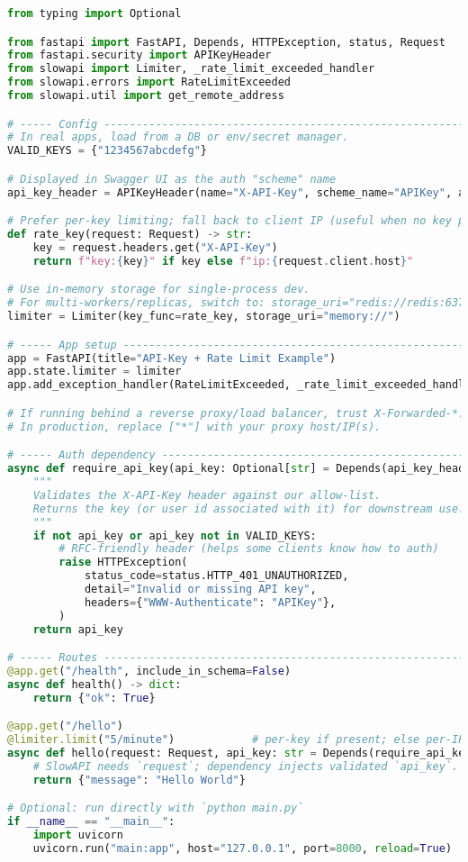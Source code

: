 \begin{lstlisting}[language=Python]
from typing import Optional

from fastapi import FastAPI, Depends, HTTPException, status, Request
from fastapi.security import APIKeyHeader
from slowapi import Limiter, _rate_limit_exceeded_handler
from slowapi.errors import RateLimitExceeded
from slowapi.util import get_remote_address

# ----- Config ---------------------------------------------------------------
# In real apps, load from a DB or env/secret manager.
VALID_KEYS = {"1234567abcdefg"}

# Displayed in Swagger UI as the auth "scheme" name
api_key_header = APIKeyHeader(name="X-API-Key", scheme_name="APIKey", auto_error=False)

# Prefer per-key limiting; fall back to client IP (useful when no key provided)
def rate_key(request: Request) -> str:
    key = request.headers.get("X-API-Key")
    return f"key:{key}" if key else f"ip:{request.client.host}"

# Use in-memory storage for single-process dev.
# For multi-workers/replicas, switch to: storage_uri="redis://redis:6379/0"
limiter = Limiter(key_func=rate_key, storage_uri="memory://")

# ----- App setup ------------------------------------------------------------
app = FastAPI(title="API-Key + Rate Limit Example")
app.state.limiter = limiter
app.add_exception_handler(RateLimitExceeded, _rate_limit_exceeded_handler)

# If running behind a reverse proxy/load balancer, trust X-Forwarded-*.
# In production, replace ["*"] with your proxy host/IP(s).

# ----- Auth dependency ------------------------------------------------------
async def require_api_key(api_key: Optional[str] = Depends(api_key_header)) -> str:
    """
    Validates the X-API-Key header against our allow-list.
    Returns the key (or user id associated with it) for downstream use.
    """
    if not api_key or api_key not in VALID_KEYS:
        # RFC-friendly header (helps some clients know how to auth)
        raise HTTPException(
            status_code=status.HTTP_401_UNAUTHORIZED,
            detail="Invalid or missing API key",
            headers={"WWW-Authenticate": "APIKey"},
        )
    return api_key

# ----- Routes ---------------------------------------------------------------
@app.get("/health", include_in_schema=False)
async def health() -> dict:
    return {"ok": True}

@app.get("/hello")
@limiter.limit("5/minute")            # per-key if present; else per-IP
async def hello(request: Request, api_key: str = Depends(require_api_key)):
    # SlowAPI needs `request`; dependency injects validated `api_key`.
    return {"message": "Hello World"}

# Optional: run directly with `python main.py`
if __name__ == "__main__":
    import uvicorn
    uvicorn.run("main:app", host="127.0.0.1", port=8000, reload=True)
\end{lstlisting}
